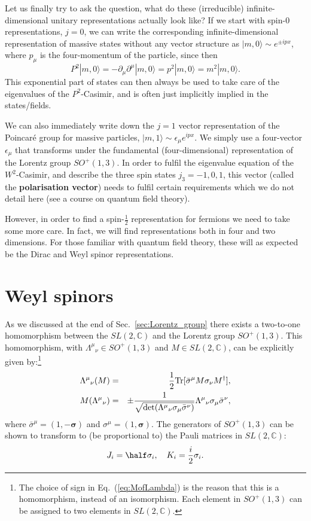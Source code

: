 \documentclass[notes.tex]{subfiles}
\begin{document}
\bigskip
Let us finally try to ask the question, what do these (irreducible) infinite-dimensional unitary representations actually look like? If we start with spin-0 representations, $j=0$, we can write the corresponding infinite-dimensional representation of massive states without any vector structure as $|m,0\rangle\sim e^{\pm ipx}$, where $p_\mu$ is the four-momentum of the particle, since then
\[P^2|m,0\rangle=-\partial_\mu\partial^\mu|m,0\rangle = p^2|m,0\rangle=m^2|m,0\rangle.\] 
This exponential part of states can then always be used to take care of the eigenvalues of the $P^2$-Casimir, and is often just implicitly implied in the states/fields.

We can also immediately write down the $j=1$ vector representation of the Poincaré group for massive particles, $|m,1\rangle\sim\epsilon_\mu e^{ipx}$. We simply use a four-vector $\epsilon_\mu$ that transforms under the fundamental (four-dimensional) representation of the Lorentz group $SO^+(1,3)$. In order to fulfil the eigenvalue equation of the $W^2$-Casimir, and describe the three spin states $j_3=-1,0,1$, this vector (called the {\bf polarisation vector}) needs to fulfil certain requirements which we do not detail here (see a course on quantum field theory).

However, in order to find a spin-$\frac{1}{2}$ representation for fermions we need to take some more care. 
In fact, we will find representations both in four and two dimensions. For those familiar with quantum field theory, these will as expected be the Dirac and Weyl spinor representations.



\section{Weyl spinors}
\label{sec:weyl}
As we discussed at the end of Sec.~\ref{sec:Lorentz_group} there exists a two-to-one homomorphism between the  $SL(2, \mathbb{C})$ and the Lorentz group $SO^+(1,3)$. This homomorphism, with $\Lambda^\mu{}_\nu \in SO^+(1,3)$ and $M \in SL(2, \mathbb{C})$, can be explicitly given by:\footnote{The choice of sign in Eq.~(\ref{eq:MofLambda}) is the reason that this is a homomorphism, instead of an isomorphism. Each element in  $SO^+(1,3)$ can be assigned to two elements in $SL(2, \mathbb{C})$.}
\begin{eqnarray}
\Lambda^\mu{}_\nu(M) &=& \frac{1}{2}{\rm Tr}[\bar{\sigma}^\mu M \sigma_\nu M^\dagger],\label{eq:LambdaofM}\\
M(\Lambda^\mu{}_\nu) &=& \pm \frac{1}{\sqrt{\det(\Lambda^\mu{}_\nu \sigma_\mu \bar{\sigma}^\nu)}}\Lambda^\mu{}_\nu \sigma_\mu \bar{\sigma}^\nu,\label{eq:MofLambda}
\end{eqnarray}
where $\bar{\sigma}^\mu = (1, -\mathbf{\sigma})$ and $\sigma^\mu = (1, \mathbf{\sigma})$. The generators of $SO^+(1,3)$ can be shown to transform to (be proportional to) the Pauli matrices in $SL(2,\mathbb C)$:
\[ J_i=\half \sigma_i, \quad K_i=\frac{i}{2}\sigma_i. \]
\end{document}
